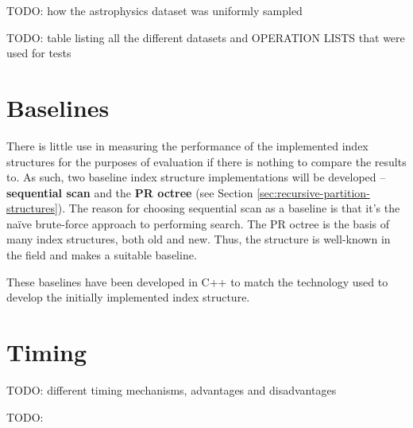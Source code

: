 TODO: how the astrophysics dataset was uniformly sampled

TODO: table listing all the different datasets and OPERATION LISTS that were used for tests

\section{Baselines}

There is little use in measuring the performance of the implemented index structures for the purposes of evaluation if there is nothing to compare the results to. As such, two baseline index structure implementations will be developed -- \textbf{sequential scan} and the \textbf{PR octree} (see Section \ref{sec:recursive-partition-structures}). The reason for choosing sequential scan as a baseline is that it's the na\"{i}ve brute-force approach to performing search. The PR octree is the basis of many index structures, both old and new. Thus, the structure is well-known in the field and makes a suitable baseline.

These baselines have been developed in C++ to match the technology used to develop the initially implemented index structure.

\section{Timing}

TODO: different timing mechanisms, advantages and disadvantages

TODO: 